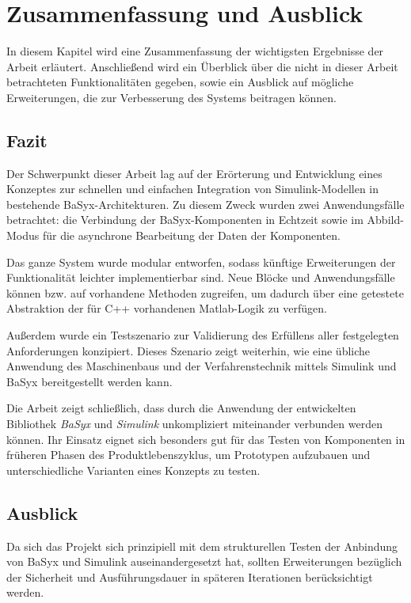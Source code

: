 \chapter{Zusammenfassung und Ausblick} \label{zusammenfassung}
In diesem Kapitel wird eine Zusammenfassung der wichtigsten Ergebnisse der Arbeit erläutert. Anschließend wird ein Überblick über die nicht in dieser Arbeit betrachteten Funktionalitäten gegeben, sowie ein Ausblick auf mögliche Erweiterungen, die zur Verbesserung des Systems beitragen können.

\section{Fazit}
Der Schwerpunkt dieser Arbeit lag auf der Erörterung und Entwicklung eines Konzeptes zur schnellen und einfachen Integration von Simulink-Modellen in bestehende BaSyx-Architekturen. Zu diesem Zweck wurden zwei Anwendungsfälle betrachtet: die Verbindung der BaSyx-Komponenten in Echtzeit sowie im Abbild-Modus für die asynchrone Bearbeitung der Daten der Komponenten.

Das ganze System wurde modular entworfen, sodass künftige Erweiterungen der Funktionalität leichter implementierbar sind. Neue Blöcke und Anwendungsfälle können bzw. auf vorhandene Methoden zugreifen, um dadurch über eine getestete Abstraktion der für C++ vorhandenen Matlab-Logik zu verfügen.    

Außerdem wurde ein Testszenario zur Validierung des Erfüllens aller festgelegten Anforderungen konzipiert. Dieses Szenario zeigt weiterhin, wie eine übliche Anwendung des Maschinenbaus und der Verfahrenstechnik mittels Simulink und BaSyx bereitgestellt werden kann.

Die Arbeit zeigt schließlich, dass durch die Anwendung der entwickelten Bibliothek \textit{BaSyx} und \textit{Simulink} unkompliziert miteinander verbunden werden können. Ihr Einsatz eignet sich besonders gut für das Testen von Komponenten in früheren Phasen des Produktlebenszyklus, um Prototypen aufzubauen und unterschiedliche Varianten eines Konzepts zu testen.


\section{Ausblick}
Da sich das Projekt sich prinzipiell mit dem strukturellen Testen der Anbindung von BaSyx und Simulink auseinandergesetzt hat, sollten Erweiterungen bezüglich der Sicherheit und Ausführungsdauer in späteren Iterationen berücksichtigt werden.

